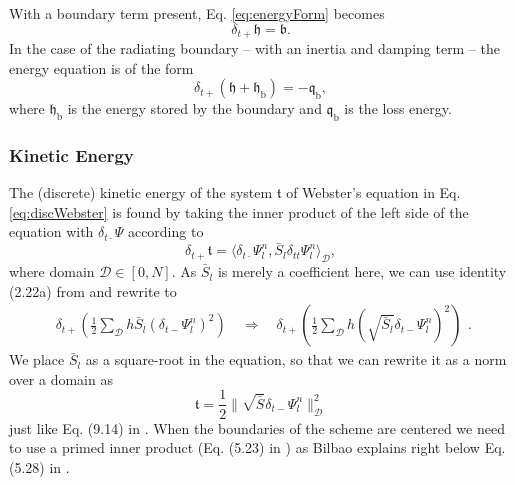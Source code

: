 \documentclass[dvipsnames]{article}
\def\Psiln{\Psi_l^n}
\def\Sbar{\bar S_l}
\def\dtd{\delta_{t\cdot}}
\begin{document}
With a boundary term present, Eq. \eqref{eq:energyForm} becomes
\begin{equation}\label{eq:energyFormBoundary}
    \delta_{t+}\mathfrak{h} = \mathfrak{b}.
\end{equation}
In the case of the radiating boundary -- with an inertia and damping term -- the energy equation is of the form
\begin{equation}\label{eq:radiatingEnergyForm}
    \delta_{t+}(\mathfrak{h}+\mathfrak{h}_\text{b}) = -\mathfrak{q}_\text{b},
\end{equation}
where $\mathfrak{h}_\text{b}$ is the energy stored by the boundary and $\mathfrak{q}_\text{b}$ is the loss energy.
\subsubsection{Kinetic Energy}
The (discrete) kinetic energy of the system $\mathfrak{t}$ of Webster's equation in Eq. \eqref{eq:discWebster} is found by taking the inner product of the left side of the equation with $\dtd\Psi$ according to
\begin{equation}
    \delta_{t+}\mathfrak{t} = \langle\dtd\Psiln,\Sbar \delta_{tt}\Psiln  \rangle_\mathcal{D},
\end{equation}
where domain $\mathcal{D}\in [0, N]$. As $\Sbar$ is merely a coefficient here, we can use identity (2.22a) from \cite{Bilbao2009} and rewrite to
\begin{equation}
    \begin{aligned}
    \delta_{t+}\left(\frac{1}{2}\sum_\mathcal{D}h\Sbar(\delta_{t-}\Psiln)^2\right)\quad \Rightarrow \quad \delta_{t+}\left(\frac{1}{2}\sum_\mathcal{D}h(\sqrt{\Sbar}\delta_{t-}\Psiln)^2\right)
    \end{aligned}.
\end{equation}
We place $\Sbar$ as a square-root in the equation, so that we can rewrite it as a norm over a domain as
\begin{equation}
    \mathfrak{t} = \frac{1}{2}\lVert\sqrt{\bar S}\delta_{t-}\Psiln\rVert_\mathcal{D}^2
\end{equation}
just like Eq. (9.14) in \cite{Bilbao2009}. When the boundaries of the scheme are centered we need to use a primed inner product (Eq. (5.23) in \cite{Bilbao2009}) as Bilbao explains right below Eq. (5.28) in \cite{Bilbao2009}.
\end{document}
